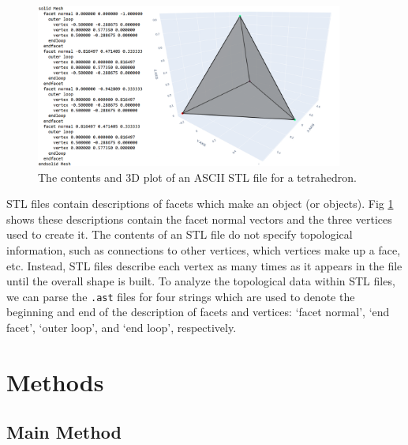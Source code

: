 \documentclass[ma]{uncgdissertationexp}
\theoremstyle{plain}
\theoremstyle{definition}
\theoremstyle{remark}
\begin{document}
\begin{figure}[H]
    \begin{center}
    \includegraphics[width=0.9\textwidth]{tetrahedron_ast_code_and_plot.png}
    \caption{The contents and 3D plot of an ASCII STL file for a tetrahedron.}
    \label{fig:ast_tetrahedron}
    \end{center}
\end{figure}

\par STL files contain descriptions of facets which make an object (or objects). Fig \ref{fig:ast_tetrahedron} shows these descriptions contain the facet normal vectors and the three vertices used to create it. The contents of an STL file do not specify topological information, such as connections to other vertices, which vertices make up a face, etc. Instead, STL files describe each vertex as many times as it appears in the file until the overall shape is built. To analyze the topological data within STL files, we can parse the \verb".ast" files for four strings which are used to denote the beginning and end of the description of facets and vertices: `facet normal', `end facet', `outer loop', and `end loop', respectively.

\chapter{Methods}\label{chap:methods}
\section{Main Method}
\end{document}

